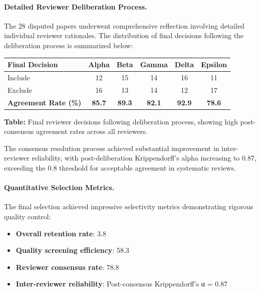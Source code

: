 \documentclass[acmsmall]{acmart}
\begin{document}
\paragraph{Detailed Reviewer Deliberation Process.} The 28 disputed papers underwent comprehensive reflection involving detailed individual reviewer rationales. The distribution of final decisions following the deliberation process is summarized below:

\begingroup
\setlength{\tabcolsep}{8pt}
\renewcommand{\arraystretch}{1.3}
\begin{center}
\begin{tabular}{lccccc}
    \toprule
    \textbf{Final Decision} & \textbf{Alpha} & \textbf{Beta} & \textbf{Gamma} & \textbf{Delta} & \textbf{Epsilon} \\
    \midrule
    Include & 12 & 15 & 14 & 16 & 11 \\
    Exclude & 16 & 13 & 14 & 12 & 17 \\
    \midrule
    \textbf{Agreement Rate (\%)} & \textbf{85.7} & \textbf{89.3} & \textbf{82.1} & \textbf{92.9} & \textbf{78.6} \\
    \bottomrule
\end{tabular}
\end{center}
\endgroup

\textbf{Table:} Final reviewer decisions following deliberation process, showing high post-consensus agreement rates across all reviewers.

The consensus resolution process achieved substantial improvement in inter-reviewer reliability, with post-deliberation Krippendorff's alpha increasing to 0.87, exceeding the 0.8 threshold for acceptable agreement in systematic reviews.

\paragraph{Quantitative Selection Metrics.} The final selection achieved impressive selectivity metrics demonstrating rigorous quality control:
\begin{itemize}
    \item \textbf{Overall retention rate}: 3.8%
    \item \textbf{Quality screening efficiency}: 58.3%
    \item \textbf{Reviewer consensus rate}: 78.8%
    \item \textbf{Inter-reviewer reliability}: Post-consensus Krippendorff's α = 0.87
\end{itemize}
\end{document}
